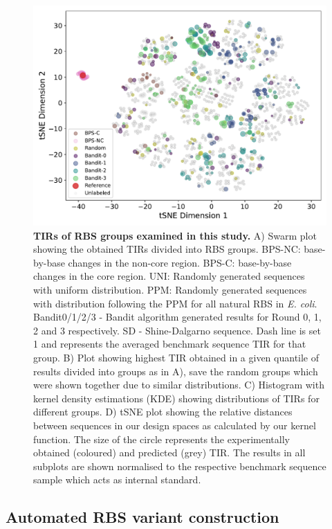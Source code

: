 \documentclass{article}
\begin{document}
\begin{figure}[!ht]
    \includegraphics[scale=0.4]{plots/Main_Paper/tsneplot.pdf}
    \caption{\textbf{TIRs of RBS groups examined in this study.} A) Swarm plot showing the obtained TIRs divided into RBS groups. BPS-NC: base-by-base changes in the non-core region. BPS-C: base-by-base changes in the core region. UNI: Randomly generated sequences with uniform distribution. PPM: Randomly generated sequences with distribution following the PPM for all natural RBS in \emph{E. coli}. Bandit0/1/2/3 - Bandit algorithm generated results for Round 0, 1, 2 and 3 respectively. SD - Shine-Dalgarno sequence. Dash line is set 1 and represents the averaged benchmark sequence TIR for that group. B) Plot showing highest TIR obtained in a given quantile of results divided into groups as in A), save the random groups which were shown together due to similar distributions. C) Histogram with kernel density estimations (KDE) showing distributions of TIRs for different groups. D) tSNE plot showing the relative distances between sequences in our design spaces as calculated by our kernel function. The size of the circle represents the experimentally obtained (coloured) and predicted (grey) TIR. The results in all subplots are shown normalised to the respective benchmark sequence sample which acts as internal standard.}
    \label{fig: Swarmplot and Quantplot}
\end{figure}

\subsection{Automated RBS variant construction}
\end{document}
